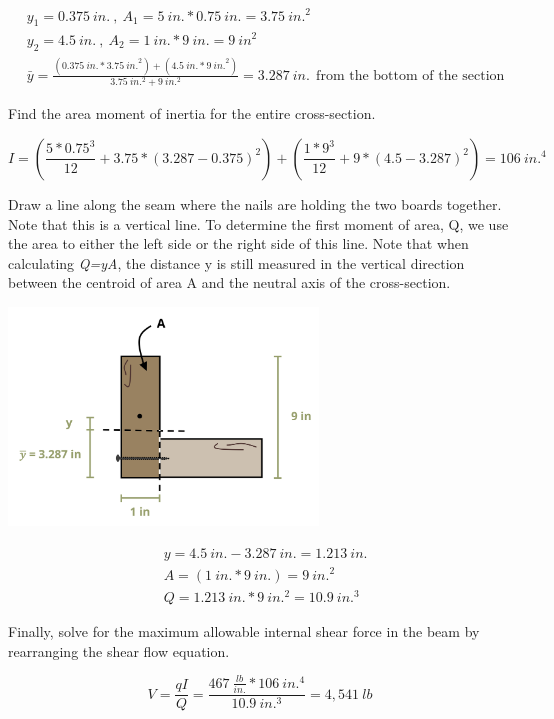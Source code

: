 \documentclass[
  letterpaper,
  DIV=11,
  numbers=noendperiod]{scrreprt}
\theoremstyle{definition}
\theoremstyle{remark}
\begin{document}
\begin{tcolorbox}
\begin{tcolorbox}
\[
\begin{aligned}
& y_1=0.375{~in.}~,~ A_1=5{~in.} * 0.75{~in.}=3.75{~in.}^2 \\
& y_2=4.5{~in.}~,~ A_2=1{~in.} * 9{~in.}=9{~in}^2 \\
& \bar{y}=\frac{(0.375{~in.} * 3.75{~in.}^2)+(4.5{~in.} * 9{~in.}^2)}{3.75{~in.^2}+9{~in.^2}} = 3.287{~in.}~~\text{from the bottom of the section}
\end{aligned}
\]

Find the area moment of inertia for the entire cross-section.

\[
I=\left(\frac{5 * 0.75^3}{12}+3.75 *(3.287-0.375)^2\right)+\left(\frac{1 * 9^3}{12}+9 *(4.5-3.287)^2\right)=106{~in.}^4
\]

Draw a line along the seam where the nails are holding the two boards
together. Note that this is a vertical line. To determine the first
moment of area, Q, we use the area to either the left side or the right
side of this line. Note that when calculating \emph{Q=yA}, the distance
y is still measured in the vertical direction between the centroid of
area A and the neutral axis of the cross-section.

\begin{center}
\includegraphics[width=3.23958in,height=\textheight]{images/CH10 PNGs/example 10.6 part 3.png}
\end{center}

\[
\begin{aligned}
& y=4.5{~in.}-3.287{~in.}=1.213{~in.} \\
& A=(1{~in.} * 9{~in.})=9{~in.}^2 \\
& Q=1.213{~in.} * 9{~in.^2}=10.9{~in.}^3
\end{aligned}
\]

Finally, solve for the maximum allowable internal shear force in the
beam by rearranging the shear flow equation.

\[
V=\frac{q I}{Q}=\frac{467~\frac{lb}{in.} * 106{~in.^4}}{10.9{~in.^3}}=4,541{~lb}
\]

\end{tcolorbox}

\end{tcolorbox}
\end{document}
